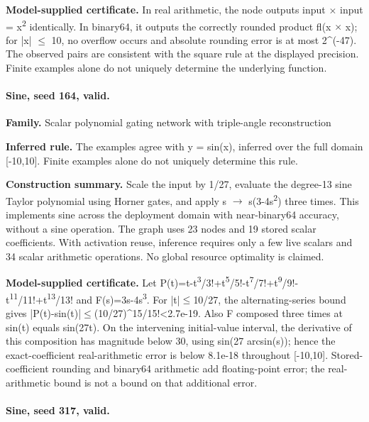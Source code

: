 \textbf{Model-supplied certificate.} In real arithmetic, the node outputs input \ensuremath{\times} input = x\textsuperscript{2} identically. In binary64, it outputs the correctly rounded product fl(x \ensuremath{\times} x); for |x| \ensuremath{\leq} 10, no overflow occurs and absolute rounding error is at most 2\textasciicircum{}(-47). The observed pairs are consistent with the square rule at the displayed precision. Finite examples alone do not uniquely determine the underlying function.


\paragraph{Sine, seed 164, valid.}

\textbf{Family.} Scalar polynomial gating network with triple-angle reconstruction


\textbf{Inferred rule.} The examples agree with y = sin(x), inferred over the full domain [-10,10]. Finite examples alone do not uniquely determine this rule.


\textbf{Construction summary.} Scale the input by 1/27, evaluate the degree-13 sine Taylor polynomial using Horner gates, and apply s \ensuremath{\to} s(3-4s\textsuperscript{2}) three times. This implements sine across the deployment domain with near-binary64 accuracy, without a sine operation. The graph uses 23 nodes and 19 stored scalar coefficients. With activation reuse, inference requires only a few live scalars and 34 scalar arithmetic operations. No global resource optimality is claimed.


\textbf{Model-supplied certificate.} Let P(t)=t-t\textsuperscript{3}/3!+t\textsuperscript{5}/5!-t\textsuperscript{7}/7!+t\textsuperscript{9}/9!-t\textsuperscript{1}\textsuperscript{1}/11!+t\textsuperscript{1}\textsuperscript{3}/13! and F(s)=3s-4s\textsuperscript{3}. For |t|\ensuremath{\leq}10/27, the alternating-series bound gives |P(t)-sin(t)|\ensuremath{\leq}(10/27)\textasciicircum{}15/15!<2.7e-19. Also F composed three times at sin(t) equals sin(27t). On the intervening initial-value interval, the derivative of this composition has magnitude below 30, using sin(27 arcsin(s)); hence the exact-coefficient real-arithmetic error is below 8.1e-18 throughout [-10,10]. Stored-coefficient rounding and binary64 arithmetic add floating-point error; the real-arithmetic bound is not a bound on that additional error.


\paragraph{Sine, seed 317, valid.}


